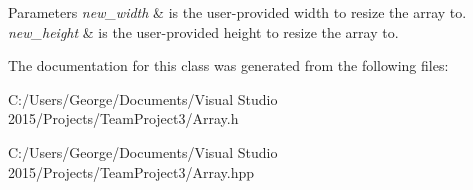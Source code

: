 \begin{DoxyParams}{Parameters}
{\em new\+\_\+width} & is the user-\/provided width to resize the array to. \\
\hline
{\em new\+\_\+height} & is the user-\/provided height to resize the array to. \\
\hline
\end{DoxyParams}


The documentation for this class was generated from the following files\+:\begin{DoxyCompactItemize}
\item 
C\+:/\+Users/\+George/\+Documents/\+Visual Studio 2015/\+Projects/\+Team\+Project3/Array.\+h\item 
C\+:/\+Users/\+George/\+Documents/\+Visual Studio 2015/\+Projects/\+Team\+Project3/Array.\+hpp\end{DoxyCompactItemize}

